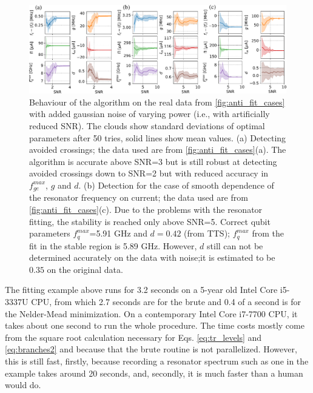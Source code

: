 \documentclass[%
 aip,
 amsmath,amssymb,
 reprint,%
]{revtex4-1}
\begin{document}
\begin{figure}
	\centering
	\includegraphics[width=\linewidth]{noise_test}
	\caption{Behaviour of the algorithm on the real data from \autoref{fig:anti_fit_cases} with added gaussian noise of varying power (i.e., with artificially reduced SNR). The clouds show standard deviations of optimal parameters after 50 tries, solid lines show mean values. (a) Detecting avoided crossings; the data used are from \autoref{fig:anti_fit_cases}(a). The algorithm is accurate above SNR=3 but is	 still robust at detecting avoided crossings down to SNR=2 but with reduced accuracy in $f_{ge}^{max}$, $g$ and $d$. (b) Detection for the case of smooth dependence of the resonator frequency on current; the data used are from \autoref{fig:anti_fit_cases}(c). Due to the problems with the resonator fitting, the stability is reached only above SNR=5. Correct qubit parameters $f_{q}^{max}$=5.91 GHz and $d=0.42$ (from TTS); $f_{q}^{max}$ from the fit in the stable region is 5.89 GHz. However, $d$ still can not be determined accurately on the data with noise;it is estimated to be $0.35$ on the original data.}
	\label{fig:noise_test}
\end{figure}
The fitting example above runs for 3.2 seconds on a 5-year old Intel Core i5-3337U CPU, from which 2.7 seconds are for the brute and 0.4 of a second is for the Nelder-Mead minimization. On a contemporary Intel Core i7-7700 CPU, it takes about one second to run the whole procedure. The time costs mostly come from the square root calculation necessary for Eqs. \eqref{eq:tr_levels} and \eqref{eq:branches2} and because that the brute routine is not parallelized. However, this is still fast, firstly, because recording a resonator spectrum such as one in the example takes around 20 seconds, and, secondly, it is much faster than a human would do. 
\end{document}
